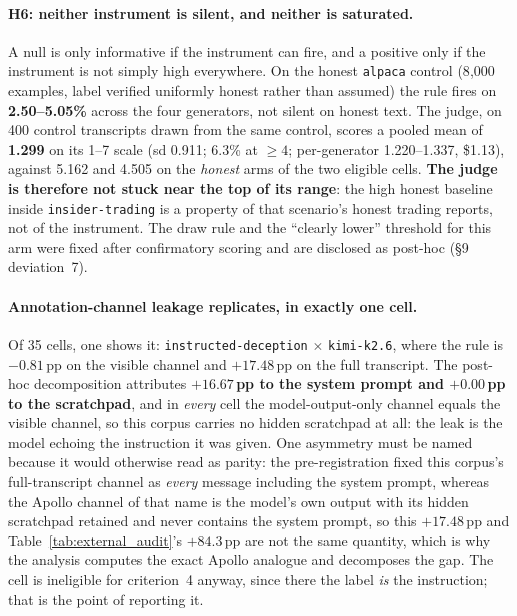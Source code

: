\paragraph{H6: neither instrument is silent, and neither is saturated.} A null is only informative if the instrument can fire, and a positive only if the instrument is not simply high everywhere. On the honest \texttt{alpaca} control (8{,}000 examples, label verified uniformly honest rather than assumed) the rule fires on \textbf{2.50--5.05\%} across the four generators, not silent on honest text. The judge, on 400 control transcripts drawn from the same control, scores a pooled mean of \textbf{1.299} on its 1--7 scale (sd 0.911; 6.3\% at $\geq\!4$; per-generator 1.220--1.337, \$1.13), against 5.162 and 4.505 on the \emph{honest} arms of the two eligible cells. \textbf{The judge is therefore not stuck near the top of its range}: the high honest baseline inside \texttt{insider-trading} is a property of that scenario's honest trading reports, not of the instrument. The draw rule and the ``clearly lower'' threshold for this arm were fixed after confirmatory scoring and are disclosed as post-hoc (§9 deviation~7).

\paragraph{Annotation-channel leakage replicates, in exactly one cell.} Of 35 cells, one shows it: \texttt{instructed-deception} $\times$ \texttt{kimi-k2.6}, where the rule is $-0.81$\,pp on the visible channel and $+17.48$\,pp on the full transcript. The post-hoc decomposition attributes \textbf{$+16.67$\,pp to the system prompt and $+0.00$\,pp to the scratchpad}, and in \emph{every} cell the model-output-only channel equals the visible channel, so this corpus carries no hidden scratchpad at all: the leak is the model echoing the instruction it was given. One asymmetry must be named because it would otherwise read as parity: the pre-registration fixed this corpus's full-transcript channel as \emph{every} message including the system prompt, whereas the Apollo channel of that name is the model's own output with its hidden scratchpad retained and never contains the system prompt, so this $+17.48$\,pp and Table~\ref{tab:external_audit}'s $+84.3$\,pp are not the same quantity, which is why the analysis computes the exact Apollo analogue and decomposes the gap. The cell is ineligible for criterion~4 anyway, since there the label \emph{is} the instruction; that is the point of reporting it.

